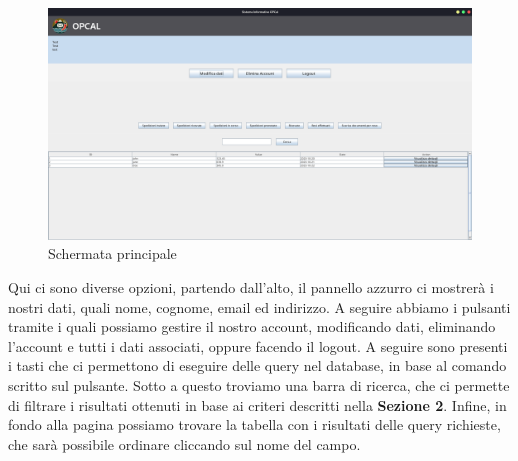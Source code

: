 \begin{figure}[H]
	\includegraphics[width=\textwidth]{assets/main_page.png}
	\caption{Schermata principale}
\end{figure}
Qui ci sono diverse opzioni, partendo dall'alto, il pannello azzurro ci mostrerà i nostri dati, quali nome, cognome, email ed indirizzo. A seguire abbiamo i pulsanti tramite i quali possiamo gestire il nostro account, modificando dati, eliminando l'account e tutti i dati associati, oppure facendo il logout.
A seguire sono presenti i tasti che ci permettono di eseguire delle query nel database, in base al comando scritto sul pulsante.
Sotto a questo troviamo una barra di ricerca, che ci permette di filtrare i risultati ottenuti in base ai criteri descritti nella \textbf{Sezione 2}.
Infine, in fondo alla pagina possiamo trovare la tabella con i risultati delle query richieste, che sarà possibile ordinare cliccando sul nome del campo.


